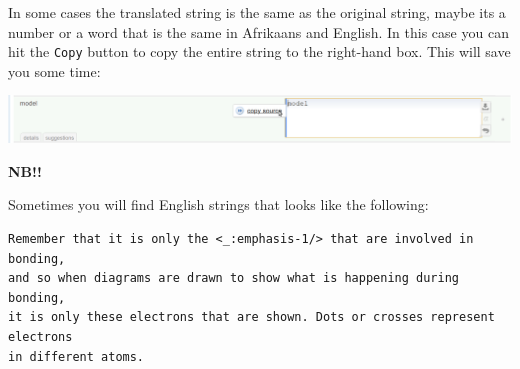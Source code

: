 \documentclass[10pt, a4paper]{article}
\begin{document}
In some cases the translated string is the same as the original string, maybe its a number or a word that is the same in Afrikaans and English. In this case you can hit the \texttt{Copy} button to copy the entire string to the right-hand box. This will save you some time:
\begin{center}
    \centerline{\includegraphics[width=0.8\paperwidth]{images/copy_source.png}}
\end{center}



\textbf{NB!!}

Sometimes you will find English strings that looks like the following:
\begin{verbatim}
Remember that it is only the <_:emphasis-1/> that are involved in bonding, 
and so when diagrams are drawn to show what is happening during bonding, 
it is only these electrons that are shown. Dots or crosses represent electrons 
in different atoms.
\end{verbatim}
\end{document}
